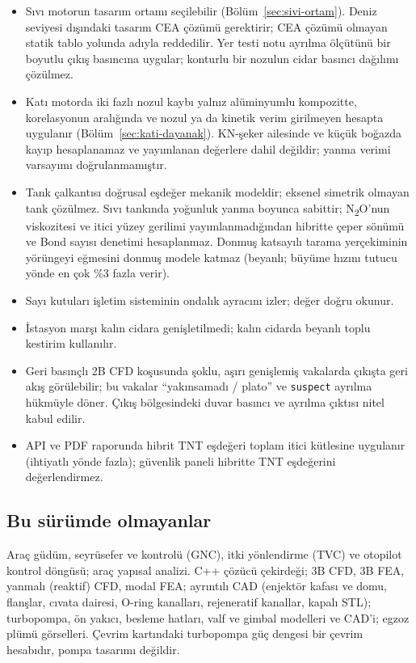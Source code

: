 \documentclass[11pt,a4paper]{article}
\newcommand{\ui}[1]{\textsf{#1}}
\newcommand{\kod}[1]{\texttt{#1}}
\begin{document}
\begin{itemize}[leftmargin=1.4em]
  gerinimi kapasiteyi tek başına aşıyorsa verilir, aksi hâlde
  \ui{Belirlenmedi} yazılır.
  \item Sıvı motorun tasarım ortamı seçilebilir (Bölüm~\ref{sec:sivi-ortam}).
  Deniz seviyesi dışındaki tasarım CEA çözümü gerektirir; CEA çözümü olmayan
  statik tablo yolunda adıyla reddedilir. Yer testi notu ayrılma ölçütünü
  bir boyutlu çıkış basıncına uygular; konturlu bir nozulun cidar basıncı
  dağılımı çözülmez.
  \item Katı motorda iki fazlı nozul kaybı yalnız alüminyumlu kompozitte,
  korelasyonun aralığında ve nozul ya da kinetik verim girilmeyen hesapta
  uygulanır (Bölüm~\ref{sec:kati-dayanak}). KN-şeker ailesinde ve küçük
  boğazda kayıp hesaplanamaz ve yayımlanan değerlere dahil değildir; yanma
  verimi varsayımı doğrulanmamıştır.
  \item Tank çalkantısı doğrusal eşdeğer mekanik modeldir; eksenel simetrik
  olmayan tank çözülmez. Sıvı tankında yoğunluk yanma boyunca sabittir;
  N\textsubscript{2}O'nun viskozitesi ve itici yüzey gerilimi
  yayımlanmadığından hibritte çeper sönümü ve Bond sayısı denetimi
  hesaplanmaz. Donmuş katsayılı tarama yerçekiminin yörüngeyi eğmesini
  donmuş modele katmaz (beyanlı; büyüme hızını tutucu yönde en çok \%3 fazla
  verir).
  \item Sayı kutuları işletim sisteminin ondalık ayracını izler; değer doğru
  okunur.
  \item İstasyon marşı kalın cidara genişletilmedi; kalın cidarda beyanlı toplu
  kestirim kullanılır.
  \item Geri basınçlı 2B CFD koşusunda şoklu, aşırı genişlemiş vakalarda
  çıkışta geri akış görülebilir; bu vakalar ``yakınsamadı / plato'' ve
  \kod{suspect} ayrılma hükmüyle döner. Çıkış bölgesindeki duvar basıncı ve
  ayrılma çıktısı nitel kabul edilir.
  \item API ve PDF raporunda hibrit TNT eşdeğeri toplam itici kütlesine
  uygulanır (ihtiyatlı yönde fazla); güvenlik paneli hibritte TNT eşdeğerini
  değerlendirmez.
\end{itemize}

\subsection{Bu sürümde olmayanlar}

Araç güdüm, seyrüsefer ve kontrolü (GNC), itki yönlendirme (TVC) ve
otopilot kontrol döngüsü; araç yapısal analizi. C++ çözücü çekirdeği; 3B CFD, 3B FEA, yanmalı (reaktif) CFD, modal FEA;
ayrıntılı CAD (enjektör kafası ve domu, flanşlar, cıvata dairesi, O-ring
kanalları, rejeneratif kanallar, kapalı STL); turbopompa, ön yakıcı, besleme
hatları, valf ve gimbal modelleri ve CAD'i; egzoz plümü görselleri. Çevrim
kartındaki turbopompa güç dengesi bir çevrim hesabıdır, pompa tasarımı
değildir.
\end{document}
